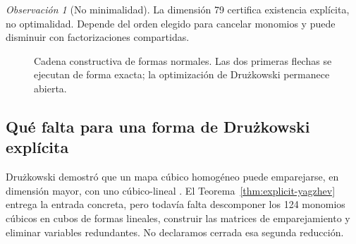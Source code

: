 \documentclass[11pt]{article}
\theoremstyle{definition}
\theoremstyle{remark}
\newtheorem{remark}[theorem]{Observaci\'on}
\newcommand{\C}{\mathbb{C}}
\begin{document}
\begin{remark}[No minimalidad]
La dimensi\'on 79 certifica existencia expl\'icita, no optimalidad. Depende del
orden elegido para cancelar monomios y puede disminuir con factorizaciones
compartidas.
\end{remark}

\begin{figure}[htbp]
\centering
{}
\caption{Cadena constructiva de formas normales. Las dos primeras flechas se
ejecutan de forma exacta; la optimizaci\'on de Dru\.zkowski permanece abierta.}
\label{fig:bcw-reduction}
\end{figure}

\subsection{Qu\'e falta para una forma de Dru\.zkowski expl\'icita}

Dru\.zkowski demostr\'o que un mapa c\'ubico homog\'eneo puede emparejarse, en
dimensi\'on mayor, con uno c\'ubico-lineal \cite{Druzkowski1983,GorniZampieri1997}.
El Teorema~\ref{thm:explicit-yagzhev} entrega la entrada concreta, pero todav\'ia
falta descomponer los 124 monomios c\'ubicos en cubos de formas lineales,
construir las matrices de emparejamiento y eliminar variables redundantes.
No declaramos cerrada esa segunda reducci\'on.
\end{document}
